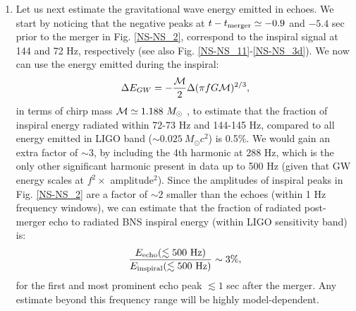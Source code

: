 \documentclass[12pt]{article}
\newcommand{\be}{\begin{equation}}
\newcommand{\ee}{\end{equation}}
\begin{document}
\begin{enumerate}
\item Let us next estimate the gravitational wave energy emitted in echoes. %
%
%
%
%
%
%
We start by noticing that the negative peaks at $t-t_{\rm merger} \simeq -0.9$ and $-5.4$ sec prior to the merger in Fig. \ref{NS-NS_2}, correspond to the inspiral signal at 144 and 72 Hz, respectively (see also Fig. \ref{NS-NS_11}-\ref{NS-NS_3d}). We now can use the energy emitted during the inspiral:
\be
\Delta E_{GW} = -\frac{{\cal M}}{2}\Delta (\pi f G {\cal M})^{2/3}, 
\ee  
in terms of chirp mass ${\cal M} \simeq 1.188 ~M_\odot$ \cite{TheLIGOScientific:2017qsa}, to estimate that the fraction of inspiral energy radiated within 72-73 Hz and 144-145 Hz, compared to all energy emitted in LIGO band ($\sim 0.025~ M_\odot c^2$) is 0.5\%. We would gain an extra factor of $\sim 3$, by including the 4th harmonic at 288 Hz, which is the only other significant harmonic present in data up to 500 Hz  (given that GW energy scales at $f^2 \times$ amplitude$^2$).  Since the amplitudes of inspiral peaks in Fig. \ref{NS-NS_2} are a factor of $\sim 2$ smaller than the echoes (within 1 Hz frequency windows), we can estimate that the fraction of radiated post-merger echo to radiated BNS inspiral energy (within LIGO sensitivity band) is:
\be
\frac{E_{\rm echo}(\lesssim 500 ~{\rm Hz})}{E_{\rm inspiral}(\lesssim 500 ~{\rm Hz})} \sim 3\%,
\ee
for the first and most prominent echo peak $\lesssim 1$ sec after the merger. Any estimate beyond this frequency range will be highly model-dependent. 


\end{enumerate}
\end{document}
